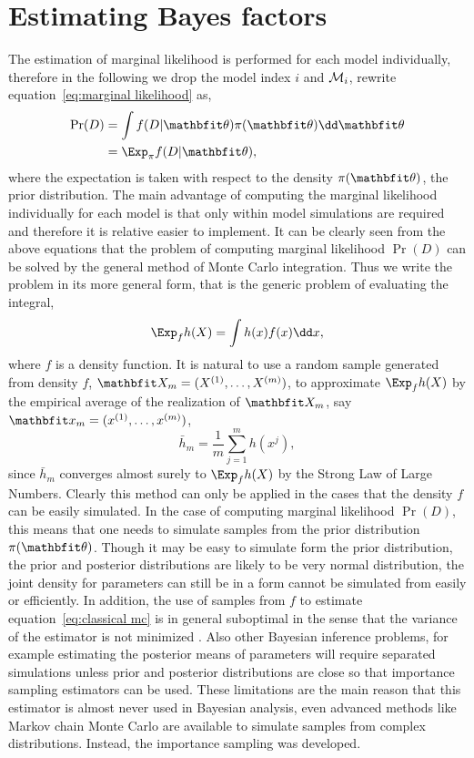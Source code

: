 \section{Estimating Bayes factors}
\label{sec:Estimating Bayes factors}

The estimation of marginal likelihood is performed for each model
individually, therefore in the following we drop the model index $i$ and
$\mathcal{M}_i$, rewrite equation~\eqref{eq:marginal likelihood} as,
\begin{align}
  \Pr(D) & = \int f(D|\bth)\pi(\bth)\dd\bth \\
  & = \Exp_{\pi} f(D|\bth),
\end{align}
where the expectation is taken with respect to the density $\pi(\bth)$, the
prior distribution. The main advantage of computing the marginal likelihood
individually for each model is that only within model simulations are required
and therefore it is relative easier to implement. It can be clearly seen from
the above equations that the problem of computing marginal likelihood $\Pr(D)$
can be solved by the general method of Monte Carlo integration. Thus we write
the problem in its more general form, that is the generic problem of
evaluating the integral,
\begin{equation}
  \Exp_f h(X) = \int h(x) f(x)
  \dd x,
  \label{eq:classical mc}
\end{equation}
where $f$ is a density function. It is natural to use a random sample
generated from density $f$, $\bfX_m = (X^{(1)},\dots,X^{(m)})$, to
approximate $\Exp_f h(X)$ by the empirical average of the realization of
$\bfX_m$, say $\bfx_m = (x^{(1)},\dots,x^{(m)})$,
\begin{equation}
  \bar{h}_m = \frac{1}{m}\sum_{j=1}^m h(x^j),
  \label{eq:is convergence}
\end{equation}
since $\bar{h}_m$ converges almost surely to $\Exp_f h(X)$ by the Strong Law
of Large Numbers. Clearly this method can only be applied in the cases that
the density $f$ can be easily simulated. In the case of computing marginal
likelihood $\Pr(D)$, this means that one needs to simulate samples from the
prior distribution $\pi(\bth)$. Though it may be easy to simulate form the
prior distribution, the prior and posterior distributions are likely to be
very normal distribution, the joint density for parameters can still be in a
form cannot be simulated from easily or efficiently. In addition, the use of
samples from $f$ to estimate equation~\eqref{eq:classical mc} is in general
suboptimal in the sense that the variance of the estimator is not minimized
\parencite[see][sec.~3.3]{Robert2004}. Also other Bayesian inference problems,
for example estimating the posterior means of parameters will require
separated simulations unless prior and posterior distributions are close so
that importance sampling estimators can be used. These limitations are the
main reason that this estimator is almost never used in Bayesian analysis,
even advanced methods like Markov chain Monte Carlo are available to simulate
samples from complex distributions. Instead, the importance sampling was
developed.

